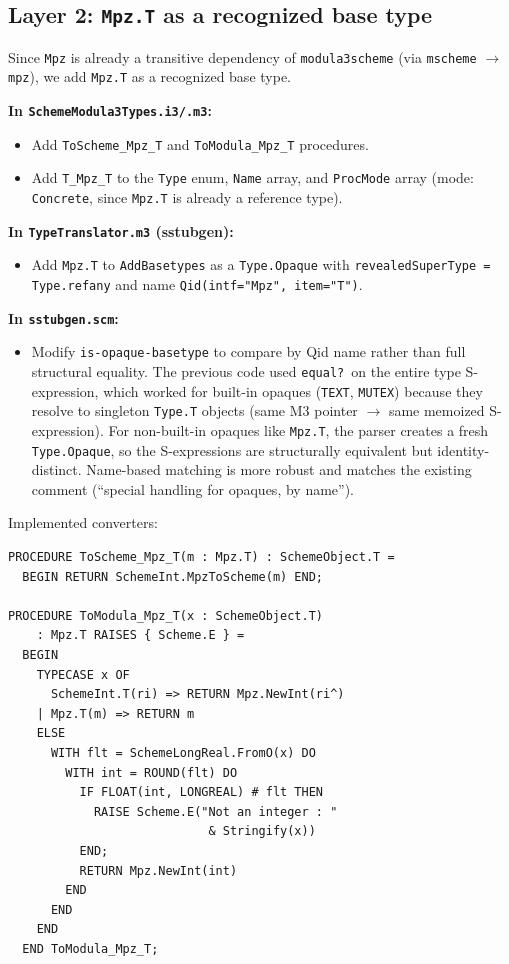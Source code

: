 \documentclass[11pt]{article}
\begin{document}
\subsection{Layer 2: \texttt{Mpz.T} as a recognized base type}

Since \texttt{Mpz} is already a transitive dependency of
\texttt{modula3scheme} (via \texttt{mscheme} $\to$ \texttt{mpz}), we
add \texttt{Mpz.T} as a recognized base type.

\textbf{In \texttt{SchemeModula3Types.i3/.m3}:}
\begin{itemize}
\item Add \texttt{ToScheme\_Mpz\_T} and \texttt{ToModula\_Mpz\_T} procedures.
\item Add \texttt{T\_Mpz\_T} to the \texttt{Type} enum, \texttt{Name}
  array, and \texttt{ProcMode} array (mode: \texttt{Concrete}, since
  \texttt{Mpz.T} is already a reference type).
\end{itemize}

\textbf{In \texttt{TypeTranslator.m3} (sstubgen):}
\begin{itemize}
\item Add \texttt{Mpz.T} to \texttt{AddBasetypes} as a
  \texttt{Type.Opaque} with \texttt{revealedSuperType = Type.refany}
  and name \texttt{Qid(intf="Mpz", item="T")}.
\end{itemize}

\textbf{In \texttt{sstubgen.scm}:}
\begin{itemize}
\item Modify \texttt{is-opaque-basetype} to compare by Qid name rather
  than full structural equality.  The previous code used
  \texttt{equal?}\ on the entire type S-expression, which worked for
  built-in opaques (\texttt{TEXT}, \texttt{MUTEX}) because they resolve
  to singleton \texttt{Type.T} objects (same M3 pointer $\to$ same
  memoized S-expression).  For non-built-in opaques like \texttt{Mpz.T},
  the parser creates a fresh \texttt{Type.Opaque}, so the S-expressions
  are structurally equivalent but identity-distinct.  Name-based matching
  is more robust and matches the existing comment (``special handling for
  opaques, by name'').
\end{itemize}

Implemented converters:
\begin{lstlisting}
PROCEDURE ToScheme_Mpz_T(m : Mpz.T) : SchemeObject.T =
  BEGIN RETURN SchemeInt.MpzToScheme(m) END;

PROCEDURE ToModula_Mpz_T(x : SchemeObject.T)
    : Mpz.T RAISES { Scheme.E } =
  BEGIN
    TYPECASE x OF
      SchemeInt.T(ri) => RETURN Mpz.NewInt(ri^)
    | Mpz.T(m) => RETURN m
    ELSE
      WITH flt = SchemeLongReal.FromO(x) DO
        WITH int = ROUND(flt) DO
          IF FLOAT(int, LONGREAL) # flt THEN
            RAISE Scheme.E("Not an integer : "
                            & Stringify(x))
          END;
          RETURN Mpz.NewInt(int)
        END
      END
    END
  END ToModula_Mpz_T;
\end{lstlisting}
\end{document}
